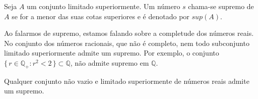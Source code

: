 \documentclass[../main.tex]{subfiles}
\begin{document}
\begin{defi}
    Seja $A$ um conjunto limitado superiormente. Um número $s$ chama-se supremo de $A$ se for a menor das suas cotas superiores e é denotado por $sup(A)$.
\end{defi}
\begin{ex}
Ao falarmos de supremo, estamos falando sobre a completude dos números reais. No conjunto dos números racionais, que não é completo, nem todo subconjunto limitado superiormente admite um supremo. Por exemplo, o conjunto $\{\, r \in \mathbb{Q}_+ : r^2 < 2 \,\} \subset \mathbb{Q}$, não admite supremo em $\mathbb{Q}$.
\end{ex}
\begin{teo}\label{enum-teo-supremo}
    Qualquer conjunto não vazio e limitado superiormente de números reais admite um supremo. 
\end{teo}
\end{document}
